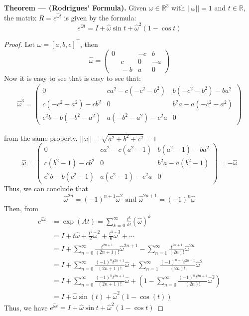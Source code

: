 \documentclass{article}
\begin{document}
\begin{tcolorbox}[enhanced,breakable, sharp corners, colback=purple!5!white, colframe=purple!55!black, boxrule=0mm,top=0mm,bottom=0mm,leftrule=1mm, drop shadow=black!50!white]
    {\color{purple!55!black} \textbf{Theorem --- (Rodrigues' Formula).}} Given $\omega \in \mathbb{R}^3$ with $||\omega||=1$ and $t\in\mathbb{R}$, the matrix $R = e^{\hat{\omega}t}$ is given by the formula:
    $$e^{\hat{\omega}t} = I + \hat{\omega}\sin t + \hat{\omega}^2(1-\cos t)$$
\end{tcolorbox}
\begin{proof} 
Let $\omega = [a, b, c]^\top$, then
$$\hat{\omega} = \begin{pmatrix}0&-c&b\\ \:\:\:\:\:\:c&0&-a\\ \:\:\:\:\:\:-b&a&0\end{pmatrix}$$
Now it is easy to see that is easy to see that:
\begin{align*}
    \hat{\omega}^3
=\begin{pmatrix}0&ca^2-c\left(-c^2-b^2\right)&b\left(-c^2-b^2\right)-ba^2\\ c\left(-c^2-a^2\right)-cb^2&0&b^2a-a\left(-c^2-a^2\right)\\ c^2b-b\left(-b^2-a^2\right)&a\left(-b^2-a^2\right)-c^2a&0\end{pmatrix}
\end{align*}

from the same property, $||\omega|| = \sqrt{a^2 + b^2 + c^2} =1$
$$\hat{\omega} = \begin{pmatrix}0&ca^2-c\left(a^2-1\right)&b\left(a^2-1\right)-ba^2\\ c\left(b^2-1\right)-cb^2&0&b^2a-a\left(b^2-1\right)\\ c^2b-b\left(c^2-1\right)&a\left(c^2-1\right)-c^2a&0\end{pmatrix} = -\hat{\omega}$$
Thus, we can conclude that
$$\hat{\omega}^{2n} = (-1)^{n+1}\hat{\omega}^{2} \text{  and  } \hat{\omega}^{2n+1} = (-1)^{n}\hat{\omega}$$
Then, from 
\begin{align*}
        e^{\hat{\omega}t} &= \exp{(At)} = \sum_{k=0}^\infty \frac{t^k}{k!}(\hat{\omega})^k\\
        &= I + t\hat{\omega} + \frac{t^2}{2}\hat{\omega}^2 + \frac{t^3}{6}\hat{\omega}^3 + \cdots \\
        &= I + \sum^{\infty}_{n=0}\frac{t^{2n+1}}{(2n+1)!}\hat{\omega}^{2n+1} - \sum^{\infty}_{n=1}\frac{t^{2n+1}}{(2n)!}\hat{\omega}^{2n}\\
        &= I + \sum^{\infty}_{n=0}\frac{(-1)^{n}t^{2n+1}}{(2n+1)!}\hat{\omega} + \sum^{\infty}_{n=1}\frac{(-1)^{n+1}t^{2n+1}}{(2n)!}\hat{\omega}^{2}\\
        &= I + \sum^{\infty}_{n=0}\frac{(-1)^{n}t^{2n+1}}{(2n+1)!}\hat{\omega} + \left(1- \sum^{\infty}_{n=0}\frac{(-1)^{n}t^{2n+1}}{(2n)!}\hat{\omega}^{2}\right)\\
        &= I + \hat{\omega}\sin(t) + \hat{\omega}^{2}(1-\cos(t))
\end{align*}
Thus, we have $e^{\hat{\omega}t} = I + \hat{\omega}\sin t + \hat{\omega}^2(1-\cos t)$
\end{proof}
\newpage
\end{document}

